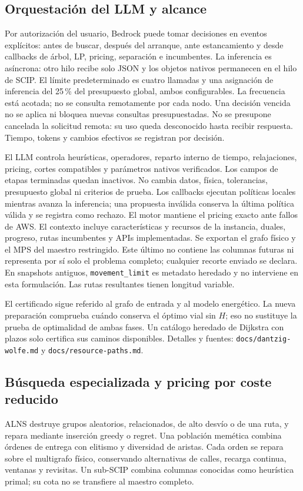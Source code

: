 \documentclass[11pt,a4paper]{article}
\newcommand{\code}[1]{\texttt{\small #1}}
\begin{document}
\subsection{Orquestación del LLM y alcance}
Por autorización del usuario, Bedrock puede tomar decisiones en eventos
explícitos: antes de buscar, después del arranque, ante estancamiento y desde
callbacks de árbol, LP, pricing, separación e incumbentes.
La inferencia es asíncrona: otro hilo recibe solo JSON y los objetos nativos
permanecen en el hilo de SCIP. El límite predeterminado es cuatro llamadas y una
asignación de inferencia del 25\,\% del presupuesto global, ambos configurables.
La frecuencia está acotada; no se consulta remotamente por cada nodo.
Una decisión vencida no se aplica ni bloquea nuevas consultas presupuestadas.
No se presupone cancelada la solicitud remota: su uso queda desconocido hasta
recibir respuesta. Tiempo, tokens y cambios efectivos se registran por decisión.

El LLM controla heurísticas, operadores, reparto interno de tiempo, relajaciones,
pricing, cortes compatibles y parámetros nativos verificados. Los campos de
etapas terminadas quedan inactivos. No cambia datos, física, tolerancias,
presupuesto global ni criterios de prueba. Los callbacks ejecutan políticas
locales mientras avanza la inferencia; una propuesta inválida conserva la última política
válida y se registra como rechazo. El motor mantiene el pricing exacto ante
fallos de AWS.
El contexto incluye características y recursos de la instancia, duales, progreso,
rutas incumbentes y APIs implementadas. Se exportan el grafo físico y el MPS del
maestro restringido. Este último no contiene las columnas futuras ni representa
por sí solo el problema completo; cualquier recorte enviado se declara.
En snapshots antiguos, \code{movement\_limit} es metadato heredado y no interviene
en esta formulación. Las rutas resultantes tienen longitud variable.

El certificado sigue referido al grafo de entrada y al modelo energético.
La nueva preparación comprueba cuándo conserva el óptimo vial sin $H$; eso
no sustituye la prueba de optimalidad de ambas fases. Un catálogo heredado de
Dijkstra con plazos solo certifica sus caminos disponibles. Detalles y fuentes:
\code{docs/dantzig-wolfe.md} y \code{docs/resource-paths.md}.

\subsection{Búsqueda especializada y pricing por coste reducido}
ALNS destruye grupos aleatorios, relacionados, de alto desvío o de una ruta,
y repara mediante inserción greedy o regret. Una población memética combina
órdenes de entrega con elitismo y diversidad de aristas. Cada orden se repara
sobre el multigrafo físico, conservando alternativas de calles, recarga continua,
ventanas y revisitas. Un sub-SCIP combina columnas conocidas como heurística
primal; su cota no se transfiere al maestro completo.
\end{document}
